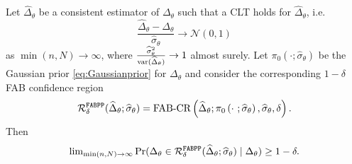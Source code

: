 \begin{lemma}
    \label{lemma:coverage_gaussian_delta}
    Let $\widehat{\Delta}_\theta$ be a consistent estimator of $\Delta_\theta$ such that a CLT holds for $\widehat{\Delta}_\theta$, i.e.
    \begin{equation*}
        \frac{\widehat{\Delta}_\theta - \Delta_\theta}{\widehat{\sigma}_\theta } \to \mathcal{N}(0, 1)
    \end{equation*}
    as $\min(n,N) \to \infty$, where $\frac{\widehat{\sigma}_\theta^2}{\mathrm{var}(\widehat{\Delta}_\theta)}\to 1$ almost surely. Let $\pi_{0}(\cdot; \widehat{\sigma}_\theta)$ be the Gaussian prior \eqref{eq:Gaussianprior} for $\Delta_\theta$ and consider the corresponding $1 - \delta$ FAB confidence region
    \begin{equation*}
        \mathcal R^{\mathrm{\texttt{FABPP}}}_\delta(\widehat{\Delta}_\theta; \widehat{\sigma}_\theta ) = \text{FAB-CR}\left(\widehat{\Delta}_\theta; \pi_{0}\left(\cdot~; \widehat{\sigma}_\theta\right), \widehat{\sigma}_\theta, \delta\right).
    \end{equation*}
    Then
    \begin{align}
        {\lim}_{\min(n,N)\to\infty}\Pr(\Delta_\theta \in \mathcal R^{\mathrm{\texttt{FABPP}}}_\delta(\widehat{\Delta}_\theta; \widehat{\sigma}_\theta )\mid \Delta_\theta)\geq 1-\delta.
    \end{align}
\end{lemma}
